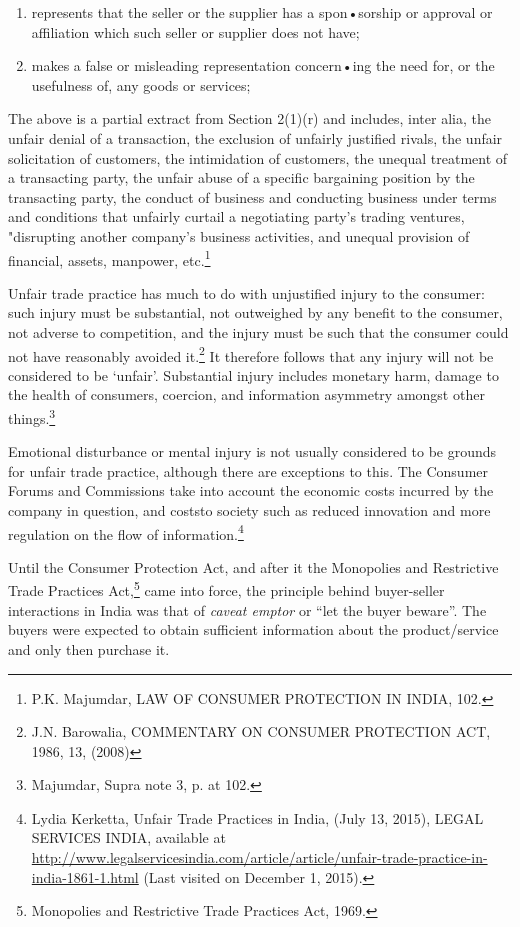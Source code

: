 \begin{multicols}{2}
{\begin{enumerate}[label=(\roman*)]
\item represents that the seller or the supplier has a spon•sorship or approval or affiliation which such seller or
supplier does not have;

\item makes a false or misleading representation concern•ing the need for, or the usefulness of, any goods or services;
\end{enumerate}}

\noi
The above is a partial extract from Section 2(1)(r) and includes, inter alia, the unfair denial of
a transaction, the exclusion of unfairly justified rivals, the unfair solicitation of customers, the
intimidation of customers, the unequal treatment of a transacting party, the unfair abuse of a
specific bargaining position by the transacting party, the conduct of business and conducting
business under terms and conditions that unfairly curtail a negotiating party's trading ventures, "disrupting another company's business activities, and unequal provision of financial, assets,
manpower, etc.\footnote{P.K. Majumdar, LAW OF CONSUMER PROTECTION IN INDIA, 102.}

\noi
Unfair trade practice has much to do with unjustified injury to the consumer: such injury must
be substantial, not outweighed by any benefit to the consumer, not adverse to competition, and
the injury must be such that the consumer could not have reasonably avoided it.\footnote{J.N. Barowalia, COMMENTARY ON CONSUMER PROTECTION ACT, 1986, 13, (2008)} It therefore follows that any injury will not be considered to be ‘unfair’. Substantial injury includes monetary harm, damage to the health of consumers, coercion, and information asymmetry amongst other things.\footnote{Majumdar, Supra note 3, p. at 102.}

\noi
Emotional disturbance or mental injury is not usually considered to be grounds for unfair trade
practice, although there are exceptions to this. The Consumer Forums and Commissions take
into account the economic costs incurred by the company in question, and coststo society such
as reduced innovation and more regulation on the flow of information.\footnote{Lydia Kerketta, Unfair Trade Practices in India, (July 13, 2015), LEGAL SERVICES INDIA, available at  \url{http://www.legalservicesindia.com/article/article/unfair-trade-practice-in-india-1861-1.html} (Last visited on
December 1, 2015).}

\noi
Until the Consumer Protection Act, and after it the Monopolies and Restrictive Trade Practices Act,\footnote{Monopolies and Restrictive Trade Practices Act, 1969.} came into force, the principle behind buyer-seller interactions in India was that of \textit{caveat emptor} or “let the buyer beware”. The buyers were expected to obtain sufficient information about the product/service and only then purchase it.


\end{multicols}
